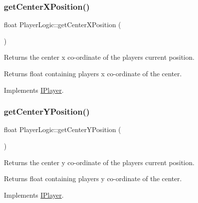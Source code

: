 \subsubsection{\texorpdfstring{get\+Center\+X\+Position()}{getCenterXPosition()}}
{\footnotesize\ttfamily float Player\+Logic\+::get\+Center\+X\+Position (\begin{DoxyParamCaption}{ }\end{DoxyParamCaption})\hspace{0.3cm}{\ttfamily [virtual]}}



Returns the center x co-\/ordinate of the player\textquotesingle{}s current position. 

\begin{DoxyReturn}{Returns}
float containing players x co-\/ordinate of the center. 
\end{DoxyReturn}


Implements \hyperlink{class_i_player}{I\+Player}.

\mbox{\label{class_player_logic_ad7b9048aee0c7b58443055f37f871537}} 
\subsubsection{\texorpdfstring{get\+Center\+Y\+Position()}{getCenterYPosition()}}
{\footnotesize\ttfamily float Player\+Logic\+::get\+Center\+Y\+Position (\begin{DoxyParamCaption}{ }\end{DoxyParamCaption})\hspace{0.3cm}{\ttfamily [virtual]}}



Returns the center y co-\/ordinate of the player\textquotesingle{}s current position. 

\begin{DoxyReturn}{Returns}
float containing players y co-\/ordinate of the center. 
\end{DoxyReturn}


Implements \hyperlink{class_i_player}{I\+Player}.

\mbox{\label{class_player_logic_aa13b870627a1d38cd1c633ac8012e5af}} 
